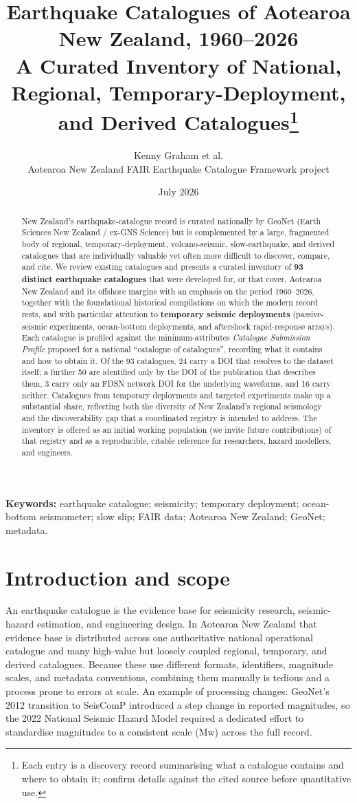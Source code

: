 \documentclass[10pt,a4paper]{article}
\title{\vspace{-1.0cm}\Huge\bfseries Earthquake Catalogues of Aotearoa New Zealand, 1960--2026\\[6pt]
\Large A Curated Inventory of National, Regional, Temporary-Deployment, and Derived Catalogues\thanks{Each entry is a discovery record summarising what a catalogue contains and where to obtain it; confirm details against the cited source before quantitative use.}}
\author{Kenny Graham et al. 
\\Aotearoa New Zealand FAIR Earthquake Catalogue Framework project}
\date{ July 2026}
\begin{document}
\maketitle
\thispagestyle{fancy}

\begin{abstract}
\noindent New Zealand's earthquake-catalogue record is curated nationally by GeoNet (Earth Sciences New Zealand / ex-GNS Science) but is complemented by a large, fragmented body of regional, temporary-deployment, volcano-seismic, slow-earthquake, and derived catalogues that are individually valuable yet often more difficult to discover, compare, and cite. We review existing catalogues and presents a curated inventory of \textbf{93 distinct earthquake catalogues} that were developed for, or that cover, Aotearoa New Zealand and its offshore margins with an emphasis on the period 1960--2026, together with the foundational historical compilations on which the modern record rests, and with particular attention to \textbf{temporary seismic deployments} (passive-seismic experiments, ocean-bottom deployments, and aftershock rapid-response arrays). Each catalogue is profiled against the minimum-attributes \emph{Catalogue Submission Profile} proposed for a national \textquotedblleft catalogue of catalogues\textquotedblright, recording what it contains and how to obtain it. Of the 93 catalogues, 24 carry a DOI that resolves to the dataset itself; a further 50 are identified only by the DOI of the publication that describes them, 3 carry only an FDSN network DOI for the underlying waveforms, and 16 carry neither. Catalogues from temporary deployments and targeted experiments make up a substantial share, reflecting both the diversity of New Zealand's regional seismology and the discoverability gap that a coordinated registry is intended to address. The inventory is offered as an initial working population (we invite future contributions) of that registry and as a reproducible, citable reference for researchers, hazard modellers, and engineers.
\end{abstract}
\vspace{4pt}
{\small\noindent\textbf{Keywords:} earthquake catalogue; seismicity; temporary deployment; ocean-bottom seismometer; slow slip; FAIR data; Aotearoa New Zealand; GeoNet; metadata.}
\tableofcontents
\newpage
\section{Introduction and scope}\label{sec:intro}
An earthquake catalogue is the evidence base for seismicity research, seismic-hazard estimation, and engineering design. In Aotearoa New Zealand that evidence base is distributed across one authoritative national operational catalogue and many high-value but loosely coupled regional, temporary, and derived catalogues. Because these use different formats, identifiers, magnitude scales, and metadata conventions, combining them manually is tedious and a process prone to errors at scale. An example of processing changes: GeoNet's 2012 transition to SeisComP introduced a step change in reported magnitudes, so the 2022 National Seismic Hazard Model required a dedicated effort to standardise magnitudes to a consistent scale (Mw) across the full record.
\end{document}
